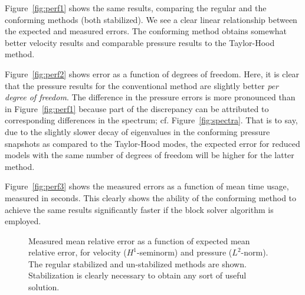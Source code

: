 \documentclass[onecolumn, twoside, a4paper, 11pt]{article}
\begin{document}
Figure~\ref{fig:perf1} shows the same results, comparing the regular and the conforming methods
(both stabilized). We see a clear linear relationship between the expected and measured errors. The
conforming method obtains somewhat better velocity results and comparable pressure results to the
Taylor-Hood method.

Figure~\ref{fig:perf2} shows error as a function of degrees of freedom. Here, it is clear that the
pressure results for the conventional method are slightly better \emph{per degree of freedom}. The
difference in the pressure errors is more pronounced than in Figure~\ref{fig:perf1} because part
of the discrepancy can be attributed to corresponding differences in the spectrum; cf. Figure~\ref{fig:spectra}.
That is to say, due to the slightly slower decay
of eigenvalues in the conforming pressure snapshots as compared to the Taylor-Hood modes, the
expected error for reduced models with the same number of degrees of freedom will be higher for the
latter method.

Figure~\ref{fig:perf3} shows the measured errors as a function of mean time usage, measured in
seconds. This clearly shows the ability of the conforming method to achieve the same results
significantly faster if the block solver algorithm is employed.

\begin{figure}
  \caption{
    Measured mean relative error as a function of expected mean relative error,
    for velocity ($H^1$-seminorm) and pressure ($L^2$-norm). The regular
    stabilized and un-stabilized methods are shown. Stabilization is clearly
    necessary to obtain any sort of useful solution.
  }
  \label{fig:perf1-unstab}
\end{figure}
\end{document}
